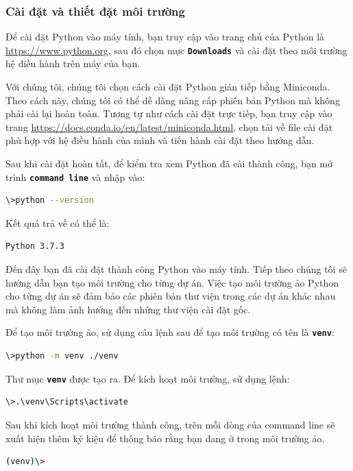 \subsubsection{Cài đặt và thiết đặt môi trường}
Để cài đặt Python vào máy tính, bạn truy cập vào trang chủ của Python là \url{https://www.python.org}, sau đó chọn mục \textbf{\texttt{Downloads}} và cài đặt theo môi trường hệ điều hành trên máy của bạn.
\par
Với chúng tôi, chúng tôi chọn cách cài đặt Python gián tiếp bằng Miniconda. Theo cách này, chúng tôi có thể dễ dàng nâng cấp phiên bản Python mà không phải cài lại hoàn toàn. Tương tự như cách cài đặt trực tiếp, bạn truy cập vào trang \url{https://docs.conda.io/en/latest/miniconda.html}, chọn tải về file cài đặt phù hợp với hệ điều hành của mình và tiến hành cài đặt theo hướng dẫn.
\par
Sau khi cài đặt hoàn tất, để kiểm tra xem Python đã cài thành công, bạn mở trình \textbf{\texttt{command line}} và nhập vào:
\begin{lstlisting}[language=bash]
\>python --version
\end{lstlisting}
\par
Kết quả trả về có thể là:
\begin{lstlisting}
Python 3.7.3
\end{lstlisting}
\par
Đến đây bạn đã cài đặt thành công Python vào máy tính. Tiếp theo chúng tôi sẽ hướng dẫn bạn tạo môi trường cho từng dự án. Việc tạo môi trường ảo Python cho từng dự án sẽ đảm bảo các phiên bản thư viện trong các dự án khác nhau mà không làm ảnh hưởng đến những thư viện cài đặt gốc.
\par
Để tạo môi trường ảo, sử dụng câu lệnh sau để tạo môi trường có tên là \textbf{\texttt{venv}}:
\begin{lstlisting}[language=bash]
\>python -m venv ./venv
\end{lstlisting}
\par
Thư mục \textbf{\texttt{venv}} được tạo ra. Để kích hoạt môi trường, sử dụng lệnh:
\begin{lstlisting}[language=bash]
\>.\venv\Scripts\activate
\end{lstlisting}
\par
Sau khi kích hoạt môi trường thành công, trên mỗi dòng của command line sẽ xuất hiện thêm ký kiệu để thông báo rằng bạn đang ở trong môi trường ảo.
\begin{lstlisting}[language=bash]
(venv)\>
\end{lstlisting}

